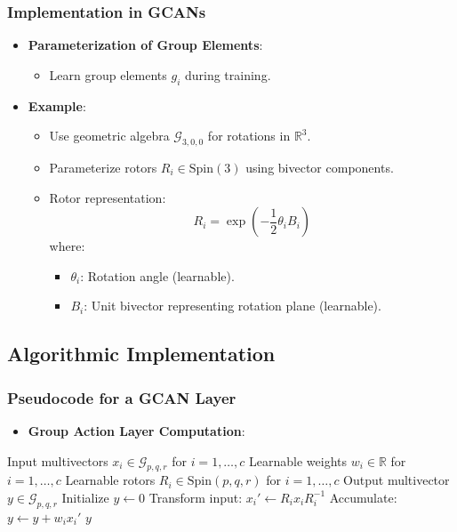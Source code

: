 \documentclass[a4paper,14pt]{article}
\theoremstyle{plain} %
\theoremstyle{definition} %
\theoremstyle{remark} %
\theoremstyle{definition}
\theoremstyle{remark}
\theoremstyle{remark}
\begin{document}
	\subsubsection{Implementation in GCANs}
	
	\begin{itemize}
		\item \textbf{Parameterization of Group Elements}:
		\begin{itemize}
			\item Learn group elements \( g_i \) during training.
		\end{itemize}
		\item \textbf{Example}:
		\begin{itemize}
			\item Use geometric algebra \( \mathcal{G}_{3,0,0} \) for rotations in \( \mathbb{R}^3 \).
			\item Parameterize rotors \( R_i \in \mathrm{Spin}(3) \) using bivector components.
			\item Rotor representation:
			\[
			R_i = \exp\left( -\frac{1}{2} \theta_i B_i \right)
			\]
			where:
			\begin{itemize}
				\item \( \theta_i \): Rotation angle (learnable).
				\item \( B_i \): Unit bivector representing rotation plane (learnable).
			\end{itemize}
		\end{itemize}
	\end{itemize}
	
	\subsection{Algorithmic Implementation}
	
	\subsubsection{Pseudocode for a GCAN Layer}
	
	\begin{itemize}
		\item \textbf{Group Action Layer Computation}:
	\end{itemize}
	
	\begin{algorithm}[H]
		\caption{Group Action Layer Computation}
		\begin{algorithmic}[1]
			\Require Input multivectors \( x_i \in \mathcal{G}_{p,q,r} \) for \( i = 1, \dots, c \)
			\Require Learnable weights \( w_i \in \mathbb{R} \) for \( i = 1, \dots, c \)
			\Require Learnable rotors \( R_i \in \mathrm{Spin}(p,q,r) \) for \( i = 1, \dots, c \)
			\Ensure Output multivector \( y \in \mathcal{G}_{p,q,r} \)
			\State Initialize \( y \gets 0 \)
			\State Transform input: \( x_i' \gets R_i x_i R_i^{-1} \)
			\State Accumulate: \( y \gets y + w_i x_i' \)
			\EndFor
			\State \Return \( y \)
		\end{algorithmic}
	\end{algorithm}
	
\end{document}
